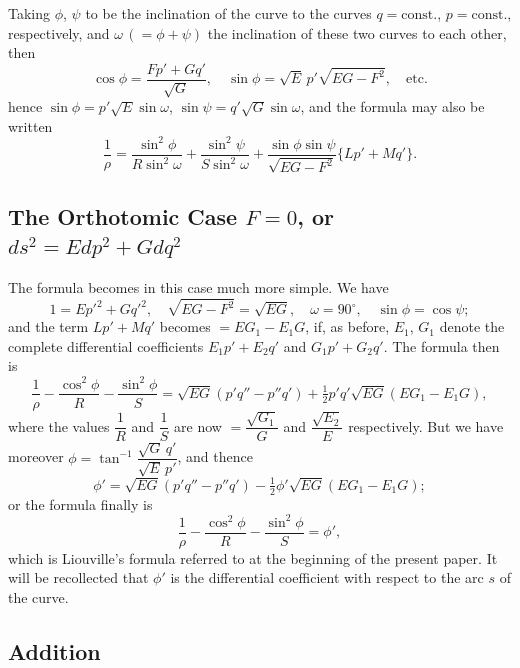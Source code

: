 \documentclass[11pt,a4paper]{book}
\begin{document}
Taking $\phi$, $\psi$ to be the inclination of the curve to the curves $q = \text{const.}$, $p = \text{const.}$, respectively, and $\omega\,(= \phi + \psi)$ the inclination of these two curves to each other, then
\[
\cos\phi = \frac{Fp' + Gq'}{\sqrt{G}},\quad \sin\phi = \sqrt{E}\,p'\sqrt{EG - F^2},\quad \text{etc.}
\]
hence $\sin\phi = p'\sqrt{E}\sin\omega$, $\sin\psi = q'\sqrt{G}\sin\omega$, and the formula may also be written
\[
\frac{1}{\rho} = \frac{\sin^2\phi}{R \sin^2\omega} + \frac{\sin^2\psi}{S \sin^2\omega} + \frac{\sin\phi \sin\psi}{\sqrt{EG - F^2}}\{Lp' + Mq'\}.
\]

\subsection*{The Orthotomic Case $F = 0$, or $ds^2 = Edp^2 + Gdq^2$}

The formula becomes in this case much more simple. We have
\[
1 = Ep'^2 + Gq'^2,\quad \sqrt{EG - F^2} = \sqrt{EG},\quad \omega = 90^\circ,\quad \sin\phi = \cos\psi;
\]
and the term $Lp' + Mq'$ becomes $= EG_1 - E_1G$, if, as before, $E_1$, $G_1$ denote the complete differential coefficients $E_1p' + E_2q'$ and $G_1p' + G_2q'$. The formula then is
\[
\frac{1}{\rho} - \frac{\cos^2\phi}{R} - \frac{\sin^2\phi}{S} = \sqrt{EG}(p'q'' - p''q') + \tfrac{1}{2}p'q'\sqrt{EG}(EG_1 - E_1G),
\]
where the values $\dfrac{1}{R}$ and $\dfrac{1}{S}$ are now $= \dfrac{\sqrt{G_1}}{G}$ and $\dfrac{\sqrt{E_2}}{E}$ respectively. But we have moreover $\phi = \tan^{-1}\dfrac{\sqrt{G}\,q'}{\sqrt{E}\,p'}$, and thence
\[
\phi' = \sqrt{EG}(p'q'' - p''q') - \tfrac{1}{2}\phi'\sqrt{EG}(EG_1 - E_1G);
\]
or the formula finally is
\[
\frac{1}{\rho} - \frac{\cos^2\phi}{R} - \frac{\sin^2\phi}{S} = \phi',
\]
which is Liouville's formula referred to at the beginning of the present paper. It will be recollected that $\phi'$ is the differential coefficient with respect to the arc $s$ of the curve.

\subsection*{Addition}
\end{document}
